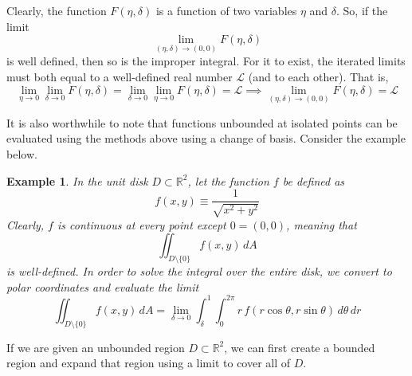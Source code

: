\documentclass{article}
\newtheorem{example}{Example}[section]
\theoremstyle{remark}
\theoremstyle{definition}
\begin{document}
Clearly, the function $F( \eta, \delta)$ is a function of two variables $\eta$ and $\delta$. So, if the limit 
\[\lim_{(\eta, \delta) \rightarrow (0, 0)} F(\eta, \delta)\]
is well defined, then so is the improper integral. For it to exist, the iterated limits must both equal to a well-defined real number $\mathcal{L}$ (and to each other). That is, 
\[\lim_{\eta \rightarrow 0} \lim_{\delta \rightarrow 0} F(\eta, \delta) = \lim_{\delta \rightarrow 0} \lim_{\eta \rightarrow 0} F(\eta, \delta) = \mathcal{L} \implies \lim_{(\eta, \delta) \rightarrow (0,0)} F(\eta, \delta) = \mathcal{L}\]


It is also worthwhile to note that functions unbounded at isolated points can be evaluated using the methods above using a change of basis. Consider the example below. 

\begin{example}
In the unit disk $D \subset \mathbb{R}^2$, let the function $f$ be defined as 
\[f(x, y) \equiv \frac{1}{\sqrt{x^2 + y^2} }\]
Clearly, $f$ is continuous at every point except $0= (0,0)$, meaning that 
\[\iint_{D \setminus \{0\}} f(x, y)\, dA\]
is well-defined. In order to solve the integral over the entire disk, we convert to polar coordinates and evaluate the limit
\[\iint_{D \setminus \{0\}} f(x, y) \, dA = \lim_{\delta \rightarrow 0} \int_{\delta}^1 \int_0^{2 \pi} r \, f( r \cos{\theta}, r \sin{\theta}) \, d\theta \,dr\]
\end{example}
\begin{center}
\end{center}

If we are given an unbounded region $D \subset \mathbb{R}^2$, we can first create a bounded region and expand that region using a limit to cover all of $D$. 
\end{document}
